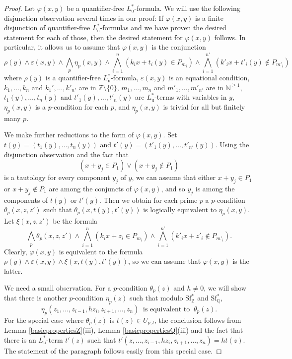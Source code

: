 \documentclass[letterpaper]{amsart}
\newcommand{\qq}{\mathbb{Q}}
\newcommand{\nn}{\mathbb{N}}
\newcommand{\zz}{\mathbb{Z}}
\newcommand{\WSFZ}{\mathrm{Sf}^*_{\zz}}
\newcommand{\WSFQ}{\mathrm{Sf}^*_{\qq}}
\begin{document}
\begin{proof}

Let  $\varphi(x, y)$ be a quantifier-free $L^*_{\mathrm{u}}$-formula. We will use the following disjunction observation several times in our proof: If $\varphi(x,y)$ is a finite disjunction of quantifier-free $L^*_{\mathrm{u}}$-formulas and we have proven the desired statement for each of those, then the desired statement for $\varphi(x,y)$ follows. In particular, it allows us to assume that $\varphi(x, y)$ is the conjunction
$$ \rho(y)  \wedge \varepsilon(x, y) \wedge \bigwedge_p \eta_p(x, y) \wedge \bigwedge_{i=1}^n (k_ix+t_i(y) \in P_{m_i}) \wedge \bigwedge_{i=1}^{n'} (k'_ix+t'_{i}(y) \notin P_{m'_i})  $$
where $\rho(y)$ is a quantifier-free $L^*_{\mathrm{u}}$-formula, $\varepsilon(x, y)$ is an equational condition,   $k_1, \ldots, k_n$ and $k_1', \ldots, k'_{n'}$ are in $\zz\setminus\{0\}$, $m_1, \ldots, m_n$ and $m'_1, \ldots, m'_{n'}$ are in $\nn^{\geq 1}$, $t_1(y), \ldots, t_n(y)$ and $t'_1(y), \ldots, t'_n(y)$ are $L^*_{\mathrm{u}}$-terms with variables in $y$,  $\eta_p(x,y)$ is a $p$-condition for each $p$, and $\eta_p(x,y)$ is trivial for all but finitely many $p$. 

We make further reductions to the form of $\varphi(x,y)$. Set $t(y) =(t_1(y), \ldots, t_n(y))$ and $t'(y)=(t'_1(y), \ldots, t'_{n'}(y))$.  Using the disjunction observation and the fact that 
$$(x+ y_j \in P_1) \vee (x + y_j \notin P_1)$$ is a tautology for every component $y_j$ of $y$, we can assume that either $x+ y_j \in P_1$ or $x + y_j \notin P_1$ are among the conjuncts of $\varphi(x, y)$, and so $y_j$ is among the components of $t(y)$ or $t'(y)$. Then we obtain for each prime $p$ a $p$-condition $\theta_p(x, z, z')$ such that $\theta_p(x, t(y), t'(y))$ is logically equivalent to $\eta_p( x, y)$. Let $\xi(x, z, z')$ be the formula 
$$ \bigwedge_p \theta_p(x, z, z') \wedge \bigwedge_{i=1}^n (k_ix+z_i\in P_{m_i}) \wedge \bigwedge_{i=1}^{n'} (k'_ix+z'_i \notin P_{m'_i}).$$
Clearly, $\varphi(x,y)$ is equivalent to the formula $\rho(y) \wedge \varepsilon(x, y) \wedge \xi(x, t(y), t'(y))$, so we can assume that $\varphi(x,y)$ is the latter.

We need a small observation. For a $p$-condition $\theta_p(z)$ and $h \neq 0$, we will show that there is another $p$-condition $\eta_p(z)$ such that modulo $\WSFZ$ and $\WSFQ$, 
$$ \eta_p(z_1, \ldots, z_{i-1}, hz_i, z_{i+1}, \ldots, z_n) \  \text{ is equivalent to } \  \theta_p(z). $$
For the special case where $\theta_p(z)$ is $t(z) \in U_{p, l}$, the conclusion follows from Lemma \ref{basicpropertiesZ}(iii), Lemma \ref{basicpropertiesQ}(iii) and the fact that there is an $L^*_{\mathrm{u}}$-term $t'(z)$ such that $t'(z, \ldots, z_{i-1}, hz_i, z_{i+1}, \ldots, z_n) = ht(z).$
The statement of the paragraph follows easily from this special case. 


\end{proof}
\end{document}
